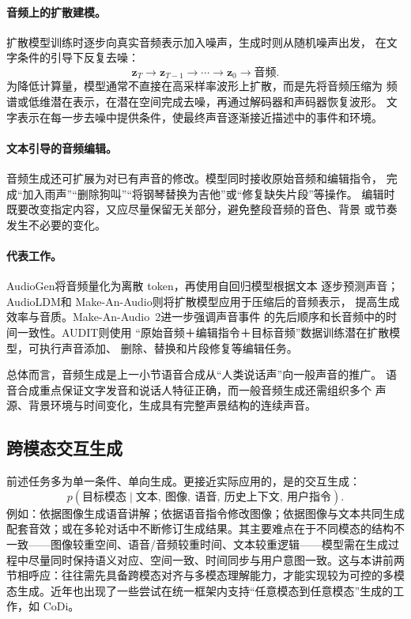 \paragraph{音频上的扩散建模。}
扩散模型训练时逐步向真实音频表示加入噪声，生成时则从随机噪声出发，
在文字条件的引导下反复去噪：
\begin{equation}
  \mathbf{z}_{T}
  \longrightarrow
  \mathbf{z}_{T-1}
  \longrightarrow \cdots \longrightarrow
  \mathbf{z}_{0}
  \longrightarrow
  \text{音频}.
\end{equation}
为降低计算量，模型通常不直接在高采样率波形上扩散，而是先将音频压缩为
频谱或低维潜在表示，在潜在空间完成去噪，再通过解码器和声码器恢复波形。
文字表示在每一步去噪中提供条件，使最终声音逐渐接近描述中的事件和环境。

\paragraph{文本引导的音频编辑。}
音频生成还可扩展为对已有声音的修改。模型同时接收原始音频和编辑指令，
完成“加入雨声”“删除狗叫”“将钢琴替换为吉他”或“修复缺失片段”等操作。
编辑时既要改变指定内容，又应尽量保留无关部分，避免整段音频的音色、背景
或节奏发生不必要的变化。

\paragraph{代表工作。}
AudioGen\cite{audiogen}将音频量化为离散 token，再使用自回归模型根据文本
逐步预测声音；AudioLDM\cite{audioldm}和
Make-An-Audio\cite{makeanaudio}则将扩散模型应用于压缩后的音频表示，
提高生成效率与音质。Make-An-Audio~2\cite{makeanaudio2}进一步强调声音事件
的先后顺序和长音频中的时间一致性。AUDIT\cite{audit}则使用
“原始音频＋编辑指令＋目标音频”数据训练潜在扩散模型，可执行声音添加、
删除、替换和片段修复等编辑任务。

总体而言，音频生成是上一小节语音合成从“人类说话声”向一般声音的推广。
语音合成重点保证文字发音和说话人特征正确，而一般音频生成还需组织多个
声源、背景环境与时间变化，生成具有完整声景结构的连续声音。

\subsection{跨模态交互生成}
\label{sub:anytoany}

前述任务多为单一条件、单向生成。更接近实际应用的，是的交互生成：
\begin{equation}
  p(\text{目标模态}\mid \text{文本},\ \text{图像},\ \text{语音},\ \text{历史上下文},\ \text{用户指令}).
\end{equation}
例如：依据图像生成语音讲解；依据语音指令修改图像；依据图像与文本共同生成配套音效；或在多轮对话中不断修订生成结果。其主要难点在于不同模态的结构不一致——图像较重空间、语音/音频较重时间、文本较重逻辑——模型需在生成过程中尽量同时保持语义对应、空间一致、时间同步与用户意图一致。这与本讲前两节相呼应：往往需先具备跨模态对齐与多模态理解能力，才能实现较为可控的多模态生成。近年也出现了一些尝试在统一框架内支持“任意模态到任意模态”生成的工作，如 CoDi\cite{codi}。

